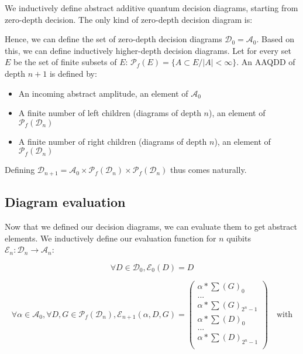 \documentclass{article}
\begin{document}
We inductively define abstract additive quantum decision diagrams, starting from zero-depth decision. The only kind of zero-depth decision diagram is:

\begin{center}
\end{center}

Hence, we can define the set of zero-depth decision diagrams $\mathcal{D}_0 = \mathcal{A}_0$. Based on this, we can define inductively higher-depth decision diagrams. Let for every set $E$ be the set of finite subsets of $E$: $\mathscr{P}_f(E) = \{ A \subset E / |A| < \infty \}$. An AAQDD of depth $n+1$ is defined by:
\begin{itemize}
    \item An incoming abstract amplitude, an element of $\mathcal{A}_0$
    \item A finite number of left children (diagrams of depth $n$), an element of $\mathscr{P}_f(\mathcal{D}_n)$
    \item A finite number of right children (diagrams of depth $n$), an element of $\mathscr{P}_f(\mathcal{D}_n)$
\end{itemize}

Defining $\mathcal{D}_{n+1} = \mathcal{A}_0 \times \mathscr{P}_f(\mathcal{D}_n) \times \mathscr{P}_f(\mathcal{D}_n)$ thus comes naturally.

\subsection{Diagram evaluation}

Now that we defined our decision diagrams, we can evaluate them to get abstract elements. We inductively define our evaluation function for $n$ quibits $\mathcal{E}_n : \mathcal{D}_n \rightarrow \mathcal{A}_n$:

$$\forall D \in \mathcal{D}_0, \mathcal{E}_0(D) = D$$

$$\forall \alpha \in \mathcal{A}_0, \forall D, G \in \mathscr{P}_f(\mathcal{D}_n), \mathcal{E}_{n+1}(\alpha, D, G) =
\begin{pmatrix}
    \alpha * \sum(G)_0 \\
    ... \\
    \alpha * \sum(G)_{2^n - 1} \\
    \alpha * \sum(D)_0 \\
    ... \\
    \alpha * \sum(D)_{2^n - 1} \\
\end{pmatrix}
\quad\text{with}
$$
\end{document}
